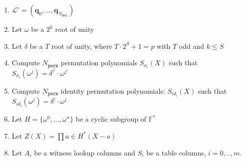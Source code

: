 \begin{algorithm}[h]
    \begin{enumerate}
        \item $\mathcal{L}' = (\textbf{q}_{0}, ..., \textbf{q}_{N_{\texttt{sel}}})$
        \item Let $\omega$ be a $2^k$ root of unity
        \item Let $\delta$ be a $T$ root of unity, where $T \cdot 2^S + 1 = p$ with $T$ odd and $k \leq S$
        \item Compute $N_{\texttt{perm}}$ permutation polynomials $S_{\sigma_i}(X)$ such that $S_{\sigma_i}(\omega^j) = \delta^{i'} \cdot \omega^{j'}$
        \item Compute $N_{\texttt{perm}}$ identity permutation polynomials: $S_{id_i}(X)$ such that $S_{id_i}(\omega^j) = \delta^i \cdot \omega^j$
        \item Let $H = \{\omega^0, ..., \omega^n\}$ be a cyclic subgroup of $\mathbb{F}^*$
        \item Let $Z(X) = \prod\limits{a \in H^*}(X - a)$
        \item Let $A_i$ be a witness lookup columns and $S_i$ be a table columns, $i = 0,.., m$.
    \end{enumerate}
\end{algorithm}

